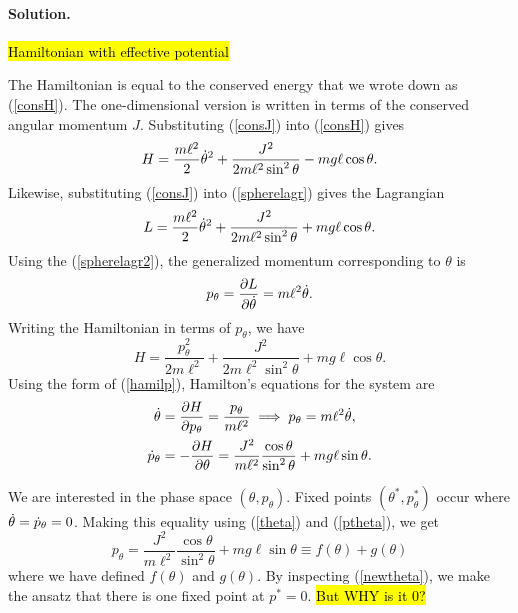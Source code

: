 \documentclass[11pt]{article}
\newcommand{\refeq}[1]{(\ref{#1})}
\newenvironment{solution}
{
    \paragraph{Solution.}
    \ignorespaces
}
{
    \bigskip
}
\begin{document}
\newcommand{\ptheta}{p_\theta}
\newcommand{\pthetad}{\dot{p}_\theta}

\begin{solution}
\hl{Hamiltonian with effective potential}

	The Hamiltonian is equal to the conserved energy that we wrote down as \refeq{consH}.  The one-dimensional version is written in terms of the conserved angular momentum $J$.  Substituting \refeq{consJ} into \refeq{consH} gives
	\begin{equation}
		H = \frac{m \ell^2}{2} \dot{\theta}^2 + \frac{J^2}{2 m \ell^2 \sin^2{\theta}} - mg \ell \cos{\theta}.
	\end{equation}
	Likewise, substituting \refeq{consJ} into \refeq{spherelagr} gives the Lagrangian
	\begin{equation} \label{spherelagr2}
		L = \frac{m \ell^2}{2} \dot{\theta}^2 + \frac{J^2}{2 m \ell^2 \sin^2{\theta}} + mg \ell \cos{\theta}.
	\end{equation}
	Using the \refeq{spherelagr2}, the generalized momentum corresponding to $\theta$  is
	\begin{equation}
		\ptheta = \pdv{L}{\thetad} = m \ell^2 \thetad.
	\end{equation}
	Writing the Hamiltonian in terms of $\ptheta$, we have
	\begin{equation} \label{hamilp}
		H = \frac{\ptheta^2}{2 m \ell^2} + \frac{J^2}{2 m \ell^2 \sin^2{\theta}} + mg \ell \cos{\theta}.
	\end{equation}
	Using the form of \refeq{hamilp}, Hamilton's equations for the system are
	\begin{align}
		\thetad &= \pdv{H}{\ptheta} = \frac{\ptheta}{m \ell^2} \implies \ptheta = m \ell^2 \thetad, \label{theta} \\
		\pthetad &= -\pdv{H}{\theta} = \frac{J^2}{m \ell^2} \frac{\cos{\theta}}{\sin^2{\theta}} + m g \ell \sin{\theta}. \label{ptheta}
	\end{align}
	
	We are interested in the phase space $(\theta, \ptheta)$.  Fixed points $(\theta^*, \ptheta^*)$ occur where $\thetad = \pthetad = 0$.  Making this equality using \refeq{theta} and \refeq{ptheta}, we get
	\begin{equation}
		\ptheta = \frac{J^2}{m \ell^2} \frac{\cos{\theta}}{\sin^2{\theta}} + m g \ell \sin{\theta} \equiv f(\theta) + g(\theta) \label{newtheta}
	\end{equation}
	where we have defined $f(\theta)$ and $g(\theta)$.  By inspecting \refeq{newtheta}, we make the ansatz that there is one fixed point at $p^* = 0$.   \hl{But WHY is it 0?}
	

\end{solution}
\end{document}
